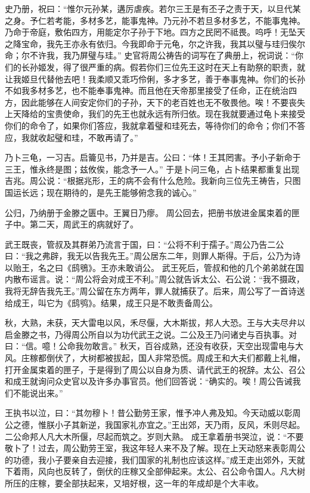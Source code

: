 \documentclass[a4paper,12pt,UTF8,twoside]{ctexbook}
\begin{document}
史乃册，祝曰：“惟尔元孙某，遘厉虐疾。若尔三王是有丕子之责于天，以旦代某之身。予仁若考能，多材多艺，能事鬼神。乃元孙不若旦多材多艺，不能事鬼神。乃命于帝庭，敷佑四方，用能定尔子孙于下地。四方之民罔不祗畏。呜呼！无坠天之降宝命，我先王亦永有依归。今我即命于元龟，尔之许我，我其以璧与珪归俟尔命；尔不许我，我乃屏璧与珪。”
史官将周公祷告的词写在了典册上，祝词说：“你们的长孙姬发，得了很严重的病。假若你们三位先王这时在天上有助祭的职责，就让我姬旦代替他去吧！我柔顺又乖巧伶俐，多才多艺，善于奉事鬼神。你们的长孙不如我多材多艺，也不能奉事鬼神。而且他在天帝那里接受了任命，正在统治四方，因此能够在人间安定你们的子孙，天下的老百姓也无不敬畏他。唉！不要丧失上天降给的宝贵使命，我们的先王也就永远有所归依。现在我就要通过龟卜来接受你们的命令了，如果你们答应，我就拿着璧和珪死去，等待你们的命令；你们不答应，我就收起璧和珪，不敢再请了。”

乃卜三龟，一习吉。启籥见书，乃并是吉。公曰：“体！王其罔害。予小子新命于三王，惟永终是图；兹攸俟，能念予一人。”
于是卜问三龟，占卜结果都重复出现吉兆。周公说：“根据兆形，王的病不会有什么危险。我新向三位先王祷告，只图国运长远；现在期待的，是先王能够俯念我的诚心。”

公归，乃纳册于金滕之匮中。王翼日乃瘳。
周公回去，把册书放进金属束着的匣子中。第二天，周武王的病就好了。

武王既丧，管叔及其群弟乃流言于国，曰：“公将不利于孺子。”周公乃告二公曰：“我之弗辟，我无以告我先王。”周公居东二年，则罪人斯得。于后，公乃为诗以贻王，名之曰《鸱鴞》。王亦未敢诮公。
武王死后，管叔和他的几个弟弟就在国内散布谣言。说：“周公将会对成王不利。”周公就告诉太公、石公说：“我不摄政，我将无辞告我先王。”周公留在东方两年，罪人就捕获了。后来，周公写了一首诗送给成王，叫它为《鸱鸮》。结果，成王只是不敢责备周公。

秋，大熟，未获，天大雷电以风，禾尽偃，大木斯拔，邦人大恐。王与大夫尽弁以启金滕之书，乃得周公所自以为功代武王之说。二公及王乃问诸史与百执事。对曰：“信。噫！公命我勿敢言。”
秋天，百谷成熟，还没有收获，天空出现雷电与大风。庄稼都倒伏了，大树都被拔起，国人非常恐慌。周成王和大夫们都戴上礼帽，打开金属束着的匣子，于是得到了周公以自身为质、请代武王的祝辞。太公、召公和成王就询问众史官以及许多办事官员。他们回答说：“确实的。唉！周公告诫我们不能说出来。”

王执书以泣，曰：“其勿穆卜！昔公勤劳王家，惟予冲人弗及知。今天动威以彰周公之德，惟朕小子其新逆，我国家礼亦宜之。”王出郊，天乃雨，反风，禾则尽起。二公命邦人凡大木所偃，尽起而筑之。岁则大熟。
成王拿着册书哭泣，说：“不要敬卜了！过去，周公勤劳王室，我这年轻人来不及了解。现在上天动怒来表彰周公的功德，我小子要亲自去迎接，我们国家的礼制也应该这样。”成王走出郊外，天就下着雨，风向也反转了，倒伏的庄稼又全部伸起来。太公、召公命令国人。凡大树所压的庄稼，要全部扶起来，又培好根，这一年的年成却是个大丰收。
\end{document}
